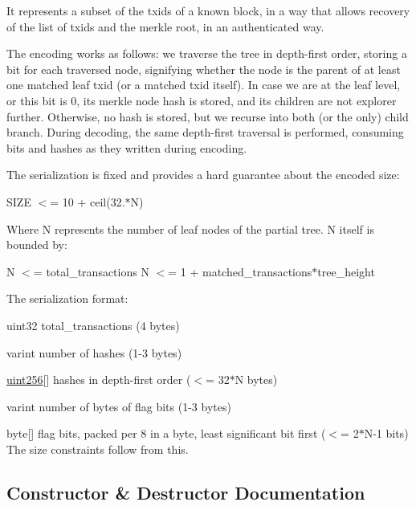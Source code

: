 It represents a subset of the txid\textquotesingle{}s of a known block, in a way that allows recovery of the list of txid\textquotesingle{}s and the merkle root, in an authenticated way.

The encoding works as follows\+: we traverse the tree in depth-\/first order, storing a bit for each traversed node, signifying whether the node is the parent of at least one matched leaf txid (or a matched txid itself). In case we are at the leaf level, or this bit is 0, its merkle node hash is stored, and its children are not explorer further. Otherwise, no hash is stored, but we recurse into both (or the only) child branch. During decoding, the same depth-\/first traversal is performed, consuming bits and hashes as they written during encoding.

The serialization is fixed and provides a hard guarantee about the encoded size\+:

S\+I\+ZE $<$= 10 + ceil(32.$\ast$N)

Where N represents the number of leaf nodes of the partial tree. N itself is bounded by\+:

N $<$= total\+\_\+transactions N $<$= 1 + matched\+\_\+transactions$\ast$tree\+\_\+height

The serialization format\+:
\begin{DoxyItemize}
\item uint32 total\+\_\+transactions (4 bytes)
\item varint number of hashes (1-\/3 bytes)
\item \mbox{\hyperlink{classuint256}{uint256}}\mbox{[}\mbox{]} hashes in depth-\/first order ($<$= 32$\ast$N bytes)
\item varint number of bytes of flag bits (1-\/3 bytes)
\item byte\mbox{[}\mbox{]} flag bits, packed per 8 in a byte, least significant bit first ($<$= 2$\ast$\+N-\/1 bits) The size constraints follow from this. 
\end{DoxyItemize}

\subsection{Constructor \& Destructor Documentation}
\mbox{\label{class_c_partial_merkle_tree_a0656767dc0d8f3d603c54e5be21d3890}} 
